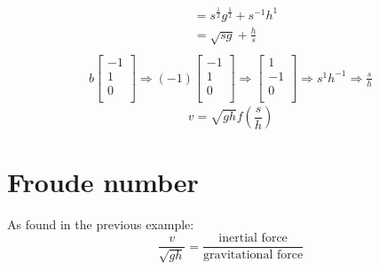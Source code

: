 \documentclass[
	date={August 26{,} 2024}
]{math486notes}
\begin{document}
\begin{example}
\begin{equation*}
\begin{aligned}
		&= s^{\frac{1}{2}}g^{\frac{1}{2}} + s^{-1}h^{1}\\ %
		&= \sqrt{sg} + \frac{h}{s}\\
	\end{aligned}
	\end{equation*}
	\begin{equation*}
	\begin{aligned}
		b\left[ \begin{array}{c}
			-1\\
			1\\
			0\\
		\end{array} \right] \Rightarrow
		(-1)\left[ \begin{array}{c}
			-1\\
			1\\
			0\\
		\end{array} \right] \Rightarrow
		\left[ \begin{array}{c}
			1\\
			-1\\
			0\\
		\end{array} \right] \Rightarrow s^{1}h^{-1} \Rightarrow \frac{s}{h}
	\end{aligned}
	\end{equation*}
	\[ v = \sqrt{gh}f\left( \frac{s}{h} \right) \] %
\end{example}

\section{Froude number}\label{sec:froude-number}
As found in the previous example:
\begin{equation*}
	\frac{v}{\sqrt{gh}} = \frac{\mbox{inertial force}}{\mbox{gravitational force}}
	\label{eq:froude-number}
\end{equation*}
\end{document}
